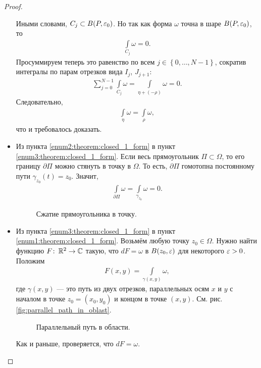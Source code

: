\documentclass[../complex-analysis.tex]{subfiles}
\begin{document}
\begin{proof}
\begin{itemize}
   Иными словами, $C_j \subset B(P,\varepsilon_0)$. Но так как форма $\omega$ точна в шаре $B(P,\varepsilon_0)$, то
   \begin{align*}
    \int\limits_{C_j} \omega = 0.
   \end{align*} Просуммируем теперь это равенство по всем $j \in \left\{ 0, \ldots,N-1 \right\}$, сократив интегралы по парам отрезков вида $I_j$, $J_{j+1}$:
   \begin{align*}
    \sum_{j=0}^{N-1} \int\limits_{C_j} \omega = \int\limits_{\eta + (- \rho)}  \omega = 0.
   \end{align*} Следовательно,
   \begin{align*}
    \int\limits_{\eta} \omega = \int\limits_{\rho} \omega,  
   \end{align*} что и требовалось доказать.
  \item Из пункта \ref{enum2:theorem:closed_1_form} в пункт \ref{enum3:theorem:closed_1_form}. Если весь прямоугольник $\Pi \subset \Omega$, то его границу $\partial \Pi$ можно стянуть в точку в $\Omega$. То есть, $\partial\Pi$ гомотопна постоянному пути $\gamma_{z_0}(t) = z_0$. Значит,
   \begin{align*}
    \int\limits_{\partial\Pi} \omega = \int\limits_{\gamma_{z_0}}   \omega = 0.
   \end{align*} 
\begin{figure}[ht]
    \centering
    \caption{Сжатие прямоугольника в точку.}
    \label{fig:rectangle_into_point}
\end{figure}

\item Из пункта \ref{enum3:theorem:closed_1_form} в пункт \ref{enum1:theorem:closed_1_form}. Возьмём любую точку $z_0 \in \Omega$. Нужно найти функцию $F \colon\, \mathbb{R}^{2} \to \mathbb{C}$ такую, что $dF = \omega$ в $B(z_0,\varepsilon)$ для некоторого $\varepsilon > 0$. Положим
 \begin{align*}
  F(x,y) = \int\limits_{\gamma(x,y)} \omega,
 \end{align*} где $\gamma(x,y)$ --- это путь из двух отрезков, параллельных осям $x$ и $y$ с началом в точке $z_0 = (x_0, y_0)$ и концом в точке $(x,y)$. См. рис. \eqref{fig:parrallel_path_in_oblast}.

\begin{figure}[ht]
    \centering
    \caption{Параллельный путь в области.}
    \label{fig:parrallel_path_in_oblast}
\end{figure}

 Как и раньше, проверяется, что $dF = \omega$.


\end{itemize}
\end{proof}
\end{document}
